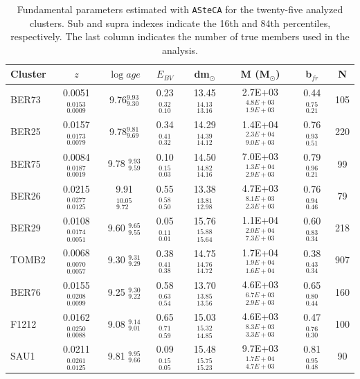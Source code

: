 \documentclass[draft]{aa}
\begin{document}
  \begin{table}
  \caption{Fundamental parameters estimated with \texttt{ASteCA} for the
  twenty-five analyzed clusters. Sub and supra indexes
  indicate the 16th and 84th percentiles, respectively. The last column
  indicates the number of true members used in the analysis.}
  \label{tab:results}
  \centering
  \begin{tabular}{lccccccc}
  \hline\hline
  Cluster & $z$ & $\log{age}$ & $E_{BV}$ & dm$_{\odot}$ & M (M$_{\odot}$) & b$_
  {fr}$ & N\\
  \hline %
  BER73 & 0.0051$_{0.0009}^{0.0153}$ & 9.76$_{9.30}^{9.93}$ & 0.23$_{0.10}^{0.32}$ &
  13.45$_{13.16}^{14.13}$ & 2.7E+03$_{1.9E+03}^{4.8E+03}$ & 0.44$_{0.21}^{0.75}$
  & 105\\[.2cm]
  BER25 &  0.0157$_{0.0079}^{0.0173}$ & 9.78$_{9.69}^{9.81}$ & 0.34$_{0.32}^{0.41}$ &
  14.29$_{14.12}^{14.39}$ & 1.4E+04$_{9.0E+03}^{2.3E+04}$ & 0.76$_{0.51}^{0.93}$
  & 220 \\[.2cm]
  BER75 & 0.0084$_{0.0019}^{0.0187}$ & 9.78 $_{9.59}^{9.93 }$ & 0.10$_{0.03}^{0.15}$ &
  14.50$_{14.16}^{14.82}$ & 7.0E+03$_{2.9E+03}^{1.3E+04}$ & 0.79$_{0.21}^{0.96}$ &
  99 \\[.2cm]
  BER26 & 0.0215$_{0.0125}^{0.0277}$ & 9.91 $_{9.72}^{10.05}$ & 0.55$_{0.50}^{0.58}$ &
  13.38$_{12.98}^{13.81}$ & 4.7E+03$_{2.3E+03}^{8.1E+03}$ & 0.76$_{0.46}^{0.94}$ &
  79 \\[.2cm]
  BER29 & 0.0108$_{0.0051}^{0.0174}$ & 9.60 $_{9.55}^{9.65 }$ & 0.05$_{0.01}^{0.11}$ &
  15.76$_{15.64}^{15.88}$ & 1.1E+04$_{7.3E+03}^{2.0E+04}$ & 0.60$_{0.34}^{0.83}$ &
  218 \\[.2cm]
  TOMB2 & 0.0068$_{0.0057}^{0.0070}$ & 9.30 $_{9.29}^{9.31 }$ & 0.38$_{0.38}^{0.41}$ &
  14.75$_{14.72}^{14.76}$ & 1.7E+04$_{1.6E+04}^{1.9E+04}$ & 0.38$_{0.34}^{0.43}$ &
  907 \\[.2cm]
  BER76 & 0.0155$_{0.0099}^{0.0208}$ & 9.25 $_{9.22}^{9.30 }$ & 0.58$_{0.54}^{0.63}$ &
  13.70$_{13.56}^{13.85}$ & 4.6E+03$_{2.9E+03}^{6.7E+03}$ & 0.65$_{0.44}^{0.80}$ &
  160 \\[.2cm]
  F1212 & 0.0162$_{0.0088}^{0.0250}$ & 9.08 $_{9.01}^{9.14 }$ & 0.65$_{0.59}^{0.71}$ &
  15.03$_{14.85}^{15.32}$ & 4.6E+03$_{3.3E+03}^{8.3E+03}$ & 0.47$_{0.30}^{0.76}$ &
  100 \\[.2cm]
  SAU1  & 0.0211$_{0.0125}^{0.0261}$ & 9.81 $_{9.66}^{9.95 }$ & 0.09$_{0.05}^{0.15}$ &
  15.48$_{15.23}^{15.75}$ & 9.7E+03$_{4.7E+03}^{1.7E+04}$ & 0.81$_{0.48}^{0.95}$ &
  90 \\[.2cm]

\end{tabular}
\end{table}
\end{document}
